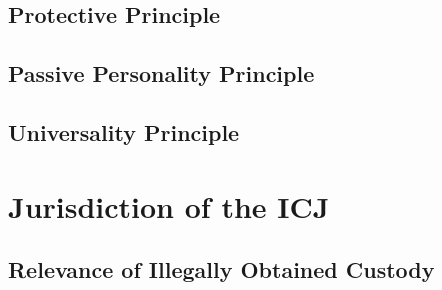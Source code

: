 \subsection{Protective Principle}

\subsection{Passive Personality Principle}

\subsection{Universality Principle}

\section{Jurisdiction of the ICJ}

\subsection{Relevance of Illegally Obtained Custody}